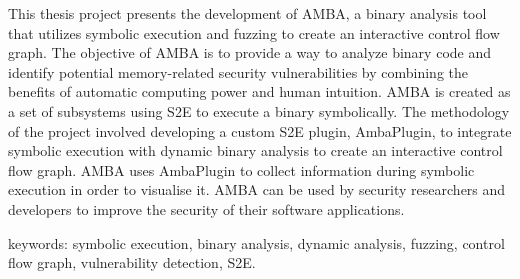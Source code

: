 This thesis project presents the development of AMBA, a binary analysis 
tool that utilizes symbolic execution and fuzzing to create an interactive 
control flow graph. The objective of AMBA is to provide a way to analyze 
binary code and identify potential memory-related security vulnerabilities 
by combining the benefits of automatic computing power and human intuition. 
AMBA is created as a set of subsystems using S2E to execute a binary 
symbolically. The methodology of the project involved developing a custom 
S2E plugin, AmbaPlugin, to integrate symbolic execution with dynamic binary 
analysis to create an interactive control flow graph. AMBA uses AmbaPlugin 
to collect information during symbolic execution in order to visualise it.
AMBA can be used by security researchers and developers to improve the 
security of their software applications.


keywords: symbolic execution, binary analysis, dynamic analysis, 
fuzzing, control flow graph, vulnerability detection, S2E. 